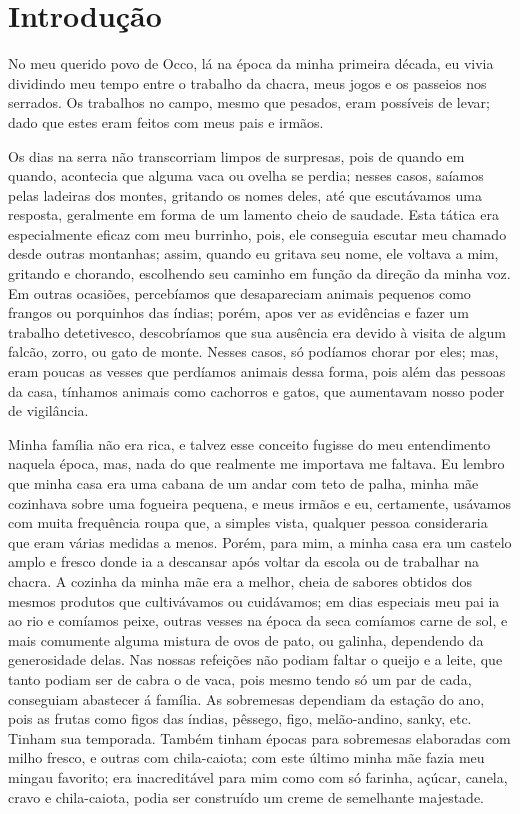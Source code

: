 \cleardoublepage
\newpage
\chapter*{Introdução} %

No meu querido povo de Occo, lá na época da minha primeira década, eu vivia dividindo meu tempo entre o trabalho da chacra, meus jogos e os passeios nos serrados.
Os trabalhos no campo, mesmo que pesados, eram possíveis de levar; dado que estes eram feitos com meus pais e irmãos.

Os dias na serra não transcorriam limpos de surpresas, pois de quando em quando, acontecia que alguma vaca ou ovelha se perdia; nesses casos, saíamos pelas ladeiras dos montes, gritando os nomes deles, até que escutávamos uma resposta, geralmente em forma de um lamento cheio de saudade.
Esta tática era especialmente eficaz com meu burrinho, pois, ele conseguia escutar meu chamado desde outras montanhas; assim, quando eu gritava seu nome, ele voltava a mim, gritando e chorando, escolhendo seu caminho em função da direção da minha voz.
Em outras ocasiões, percebíamos que desapareciam animais pequenos como frangos ou porquinhos das índias; porém, apos ver as evidências e fazer um trabalho detetivesco, descobríamos que sua ausência era devido à visita de algum falcão, zorro, ou gato de monte.
Nesses casos, só podíamos chorar por eles; mas,  eram poucas as vesses que perdíamos animais dessa forma, pois além das pessoas da casa, tínhamos animais como cachorros e gatos, que aumentavam nosso poder de vigilância.

Minha família não era rica, e talvez esse conceito fugisse do meu entendimento naquela época, mas, nada do que realmente me importava me faltava.
Eu lembro que minha casa era uma cabana de um andar com teto de palha, minha mãe cozinhava sobre uma fogueira pequena, e meus irmãos e eu, certamente, usávamos com muita frequência roupa que, a simples vista, qualquer pessoa consideraria que eram várias medidas a menos.
Porém, para mim, a minha casa era um castelo amplo e fresco donde ia a descansar após voltar da escola ou de trabalhar na chacra. 
A cozinha da minha mãe era a melhor, cheia de sabores obtidos dos mesmos produtos que cultivávamos ou cuidávamos; em dias especiais meu pai ia ao rio e comíamos peixe, outras vesses na época da seca comíamos carne de sol, e mais comumente alguma mistura de ovos de pato, ou galinha, dependendo da generosidade delas.
Nas nossas refeições não podiam faltar o queijo e a leite, que tanto podiam ser de cabra o de vaca, pois mesmo tendo só um par de cada, conseguiam abastecer á família.
As sobremesas dependiam da estação do ano, pois as frutas como figos das índias, pêssego, figo, melão-andino, sanky, etc. Tinham sua temporada. Também tinham épocas para sobremesas elaboradas com milho fresco, e outras com chila-caiota; com este último minha mãe fazia meu mingau favorito; era inacreditável para mim como com só farinha, açúcar, canela, cravo e chila-caiota, podia ser construído um creme de semelhante majestade.

